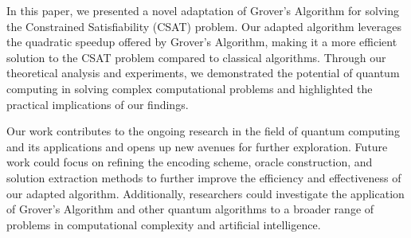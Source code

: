 In this paper, we presented a novel adaptation of Grover's Algorithm for solving the Constrained Satisfiability (CSAT) problem. Our adapted algorithm leverages the quadratic speedup offered by Grover's Algorithm, making it a more efficient solution to the CSAT problem compared to classical algorithms. Through our theoretical analysis and experiments, we demonstrated the potential of quantum computing in solving complex computational problems and highlighted the practical implications of our findings.

Our work contributes to the ongoing research in the field of quantum computing and its applications and opens up new avenues for further exploration. Future work could focus on refining the encoding scheme, oracle construction, and solution extraction methods to further improve the efficiency and effectiveness of our adapted algorithm. Additionally, researchers could investigate the application of Grover's Algorithm and other quantum algorithms to a broader range of problems in computational complexity and artificial intelligence.


